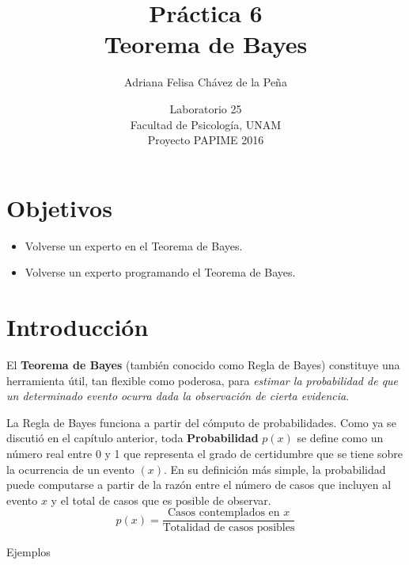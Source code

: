 \documentclass[letterpaper,12pt]{article}
\title{Práctica 6 \\ Teorema de Bayes}
\author{Adriana Felisa Chávez de la Peña}
\date{Laboratorio 25\\Facultad de Psicología, UNAM\\Proyecto PAPIME 2016}
\newcommand\ddfrac[2]{\frac{\displaystyle #1}{\displaystyle #2}}
\begin{document}
\renewcommand{\tablename}{Tabla}
\maketitle

\section*{Objetivos}
\begin{itemize}
\item Volverse un experto en el Teorema de Bayes.
\item Volverse un experto programando el Teorema de Bayes.
\end{itemize}

\section{Introducción}
El \textbf{Teorema de Bayes} (también conocido como Regla de Bayes) constituye una herramienta útil, tan flexible como poderosa, para \textit{estimar la probabilidad de que un determinado evento ocurra dada la observación de cierta evidencia}.

La Regla de Bayes funciona a partir del cómputo de probabilidades. Como ya se discutió en el capítulo anterior, toda \textbf{Probabilidad} $p(x)$ se define como un número real entre 0 y 1 que representa el grado de certidumbre que se tiene sobre la ocurrencia de un evento $(x)$. En su definición más simple, la probabilidad puede computarse a partir de la razón entre el número de casos que incluyen al evento $x$  y el total de casos que es posible de observar.
\[p(x) = \ddfrac{\textrm{Casos contemplados en }x}{\textrm{Totalidad de casos posibles}}\]

\begin{bclogo}[logo=\bccoeur,couleur=blue!20]{Ejemplos}

\end{bclogo}
\end{document}
